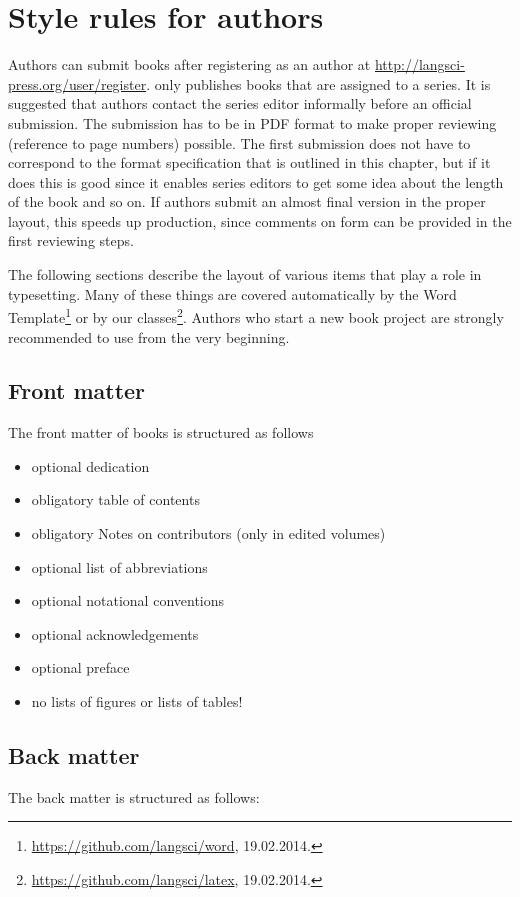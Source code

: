 \chapter{Style rules for authors}

Authors can submit books after registering as an author at
\url{http://langsci-press.org/user/register}. \lsp only publishes books that are assigned to a
series. It is suggested that authors contact the series editor informally before an official submission.
The submission has to be in PDF format to make proper
reviewing (reference to page numbers) possible. The first submission does not have to correspond to
the format specification that is outlined in this chapter, but if it does this is good since it
enables series editors to get some idea about the length of the book and so on. If authors submit an
almost final version in the proper layout, this speeds up production, since comments on form can be
provided in the first reviewing steps.


The following sections describe the layout of various items that play a role in typesetting. Many of
these things are covered automatically by the Word Template\footnote{
\url{https://github.com/langsci/word}, 19.02.2014.
} or by our \latex classes\footnote{
\url{https://github.com/langsci/latex}, 19.02.2014.
}. Authors who start a new book project are strongly recommended to use \latex from the very beginning.


\section{Front matter}
The front matter of \lsp books is structured as follows
\begin{itemize}
 \item optional dedication
 \item obligatory table of contents 
 \item obligatory Notes on contributors (only in edited volumes)
 \item optional list of abbreviations
 \item optional notational conventions
 \item optional acknowledgements
 \item optional preface
 \item no lists of figures or lists of tables!
\end{itemize}

\section{Back matter}
The back matter is structured as follows:

